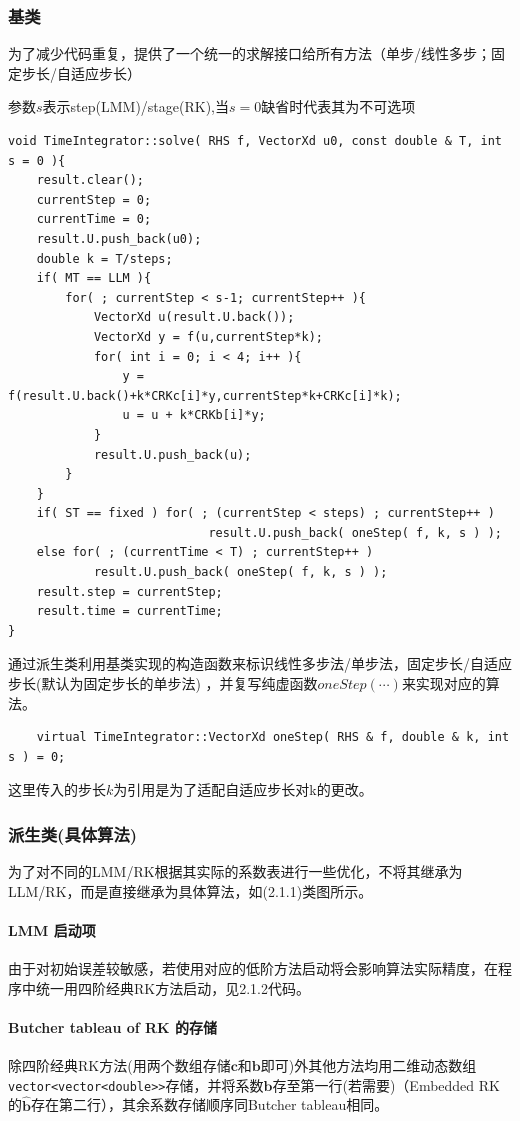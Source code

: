 \documentclass{article}
\begin{document}
\subsubsection{基类}

为了减少代码重复，提供了一个统一的求解接口给所有方法（单步/线性多步；固定步长/自适应步长）

参数$s$表示step(LMM)/stage(RK),当$s=0$缺省时代表其为不可选项
\begin{lstlisting}
void TimeIntegrator::solve( RHS f, VectorXd u0, const double & T, int s = 0 ){
    result.clear();
    currentStep = 0;
    currentTime = 0;
    result.U.push_back(u0);
    double k = T/steps;
    if( MT == LLM ){
        for( ; currentStep < s-1; currentStep++ ){
            VectorXd u(result.U.back());
            VectorXd y = f(u,currentStep*k);
            for( int i = 0; i < 4; i++ ){
                y = f(result.U.back()+k*CRKc[i]*y,currentStep*k+CRKc[i]*k);
                u = u + k*CRKb[i]*y;
            }
            result.U.push_back(u);
        }
    }
    if( ST == fixed ) for( ; (currentStep < steps) ; currentStep++ ) 
                            result.U.push_back( oneStep( f, k, s ) );
    else for( ; (currentTime < T) ; currentStep++ ) 
            result.U.push_back( oneStep( f, k, s ) );
    result.step = currentStep;
    result.time = currentTime;
}
\end{lstlisting}

通过派生类利用基类实现的构造函数来标识线性多步法/单步法，固定步长/自适应步长(默认为固定步长的单步法)
，并复写纯虚函数$oneStep(\cdots)$来实现对应的算法。
\begin{lstlisting}
    virtual TimeIntegrator::VectorXd oneStep( RHS & f, double & k, int s ) = 0;
\end{lstlisting}
这里传入的步长$k$为引用是为了适配自适应步长对k的更改。

\subsubsection{派生类(具体算法)}
为了对不同的LMM/RK根据其实际的系数表进行一些优化，不将其继承为LLM/RK，而是直接继承为具体算法，如(2.1.1)类图所示。

\paragraph{LMM 启动项} 由于对初始误差较敏感，若使用对应的低阶方法启动将会影响算法实际精度，在程序中统一用四阶经典RK方法启动，见2.1.2代码。

\paragraph{Butcher tableau of RK 的存储} 除四阶经典RK方法(用两个数组存储$\mathbf{c}$和$\mathbf{b}$即可)外其他方法均用二维动态数组\verb|vector<vector<double>>|存储，并将系数$\mathbf{b}$存至第一行(若需要)（Embedded RK 的$\mathbf{\hat{b}}$存在第二行），其余系数存储顺序同Butcher tableau相同。
\end{document}
